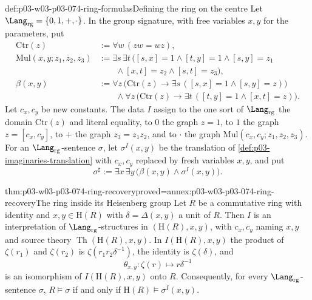 \begin{hbdefinition}{def:p03-w03-p03-074-ring-formulas}{Defining the ring on the centre}
Let \(\Lang_{\mathrm{rg}}=\{0,1,+,\cdot\}\). In the group signature,
with free variables \(x,y\) for the parameters, put
\[\begin{aligned}
  \mathrm{Ctr}(z)&:=\forall w\,(zw=wz),\\
  \mathrm{Mul}(x,y;z_1,z_2,z_3)&:=\exists s\,\exists t\,
     \bigl([s,x]=1\land[t,y]=1\land[s,y]=z_1\\
     &\qquad\land[x,t]=z_2\land[s,t]=z_3\bigr),\\
  \beta(x,y)&:=\forall z\,\bigl(\mathrm{Ctr}(z)\to
       \exists s\,([s,x]=1\land[s,y]=z)\bigr)\\
     &\qquad\land\forall z\,\bigl(\mathrm{Ctr}(z)\to
       \exists t\,([t,y]=1\land[x,t]=z)\bigr).
\end{aligned}\]
Let \(c_x,c_y\) be new constants. The data \(I\) assign to the one sort
of \(\Lang_{\mathrm{rg}}\) the domain \(\mathrm{Ctr}(z)\) and literal
equality, to \(0\) the graph \(z=1\), to \(1\) the graph
\(z=[c_x,c_y]\), to \(+\) the graph \(z_3=z_1z_2\), and to \(\cdot\)
the graph \(\mathrm{Mul}(c_x,c_y;z_1,z_2,z_3)\). For an
\(\Lang_{\mathrm{rg}}\)-sentence \(\sigma\), let \(\sigma^I(x,y)\) be
the translation of \cref{def:p03-imaginaries-translation} with \(c_x,c_y\)
replaced by fresh variables \(x,y\), and put
\[
  \sigma^{\sharp}:=\exists x\,\exists y\,\bigl(\beta(x,y)\land\sigma^I(x,y)\bigr).
\]
\end{hbdefinition}

\begin{hbtheorem}{thm:p03-w03-p03-074-ring-recovery}{proved=annex:p03-w03-p03-074-ring-recovery}{The ring inside its Heisenberg group}
Let \(R\) be a commutative ring with identity and \(x,y\in\mathrm H(R)\)
with \(\delta=\Delta(x,y)\) a unit of \(R\). Then \(I\) is an
interpretation of \(\Lang_{\mathrm{rg}}\)-structures in
\((\mathrm H(R),x,y)\), with \(c_x,c_y\) naming \(x,y\) and source theory
\(\operatorname{Th}(\mathrm H(R),x,y)\). In \(I(\mathrm H(R),x,y)\) the
product of \(\zeta(r_1)\) and \(\zeta(r_2)\) is
\(\zeta(r_1r_2\delta^{-1})\), the identity is \(\zeta(\delta)\), and
\[
  \theta_{x,y}:\zeta(r)\longmapsto r\delta^{-1}
\]
is an isomorphism of \(I(\mathrm H(R),x,y)\) onto \(R\). Consequently,
for every \(\Lang_{\mathrm{rg}}\)-sentence \(\sigma\),
\(R\models\sigma\) if and only if \(\mathrm H(R)\models\sigma^I(x,y)\).
\end{hbtheorem}

